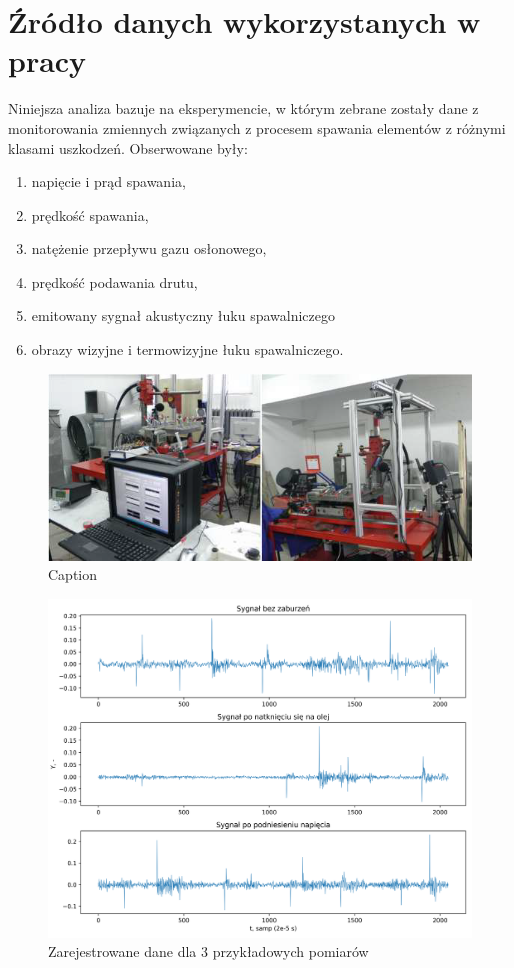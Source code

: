 \documentclass{mwart}
\begin{document}
\section{Źródło danych wykorzystanych w pracy}
Niniejsza analiza bazuje na eksperymencie, w którym zebrane zostały dane z monitorowania zmiennych związanych z procesem spawania elementów z różnymi klasami uszkodzeń. Obserwowane były:
\begin{enumerate}
    \item napięcie i prąd spawania,
    \item prędkość spawania,
    \item natężenie przepływu gazu osłonowego,
    \item prędkość podawania drutu,
    \item emitowany sygnał akustyczny łuku spawalniczego
    \item obrazy wizyjne i termowizyjne łuku spawalniczego.
\end{enumerate}
\begin{figure}[ht]
    \centering
    \includegraphics[width=0.6\linewidth]{stanowisko.png}
    \caption{Caption}
    \label{fig:stanowisko}
\end{figure}
\begin{figure}[h!]
    \centering
    \includegraphics[width=\linewidth]{surowy_sygnal.png}
    \caption{Zarejestrowane dane dla 3 przykładowych pomiarów}
    \label{fig:3_runs}
\end{figure}
\end{document}
